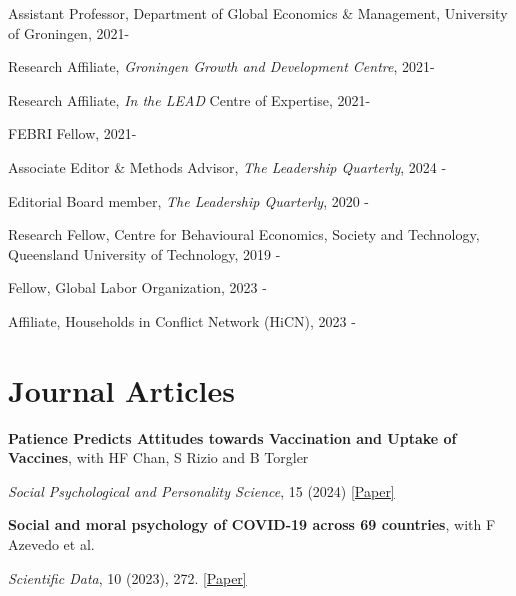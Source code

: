 \documentclass[letterpaper]{article}
\renewenvironment{itemize}{
  \begin{list}{}{
    \setlength{\leftmargin}{1.5em}
  }
}{
  \end{list}
}
\begin{document}
\begin{itemize}
	
	\item Assistant Professor, Department of Global Economics \& Management, University of Groningen, 2021-
	\begin{itemize}
	\item Research Affiliate, \textit{Groningen Growth and Development Centre}, 2021-
	\item Research Affiliate, \textit{In the LEAD} Centre of Expertise, 2021-
	\item FEBRI Fellow, 2021-
	\end{itemize}
	\item Associate Editor \& Methods Advisor, \textit{The Leadership Quarterly}, 2024 -
	\item Editorial Board member, \textit{The Leadership Quarterly}, 2020 -
	\item Research Fellow, Centre for Behavioural Economics, Society and Technology, Queensland University of Technology, 2019 -
	\item Fellow, Global Labor Organization, 2023 -
	\item Affiliate, Households in Conflict Network (HiCN), 2023 -
\end{itemize}



\section*{Journal Articles}

\begin{itemize}
			\item {\bf Patience Predicts Attitudes towards Vaccination and Uptake of Vaccines}, with HF Chan, S Rizio and B Torgler
 			\vspace{-0.05in}
	\item \textit{Social Psychological and Personality Science}, 15 (2024) \href{https://journals.sagepub.com/doi/full/10.1177/19485506231189905/}{[Paper]}
	
\end{itemize}
				\medskip
		
		\begin{itemize}
	\item \textbf{Social and moral psychology of COVID-19 across 69 countries}, with F Azevedo et al. 
			\vspace{-0.05in}
	\item \textit{Scientific Data}, 10 (2023), 272.  \href{https://psyarxiv.com/a3562/}{[Paper]}
\end{itemize}
\end{document}
